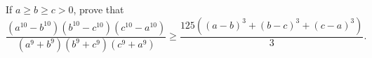 If $a\ge b\ge c>0$, prove that
\[\dfrac{\left(a^{10}-b^{10}\right)\left(b^{10}-c^{10}\right)\left(c^{10}-a^{10}\right)}{\left(a^9+b^9\right)\left(b^9+c^9\right)\left(c^9+a^9\right)}\ge\dfrac{125\left((a-b)^3+(b-c)^3+(c-a)^3\right)}{3}.\]
